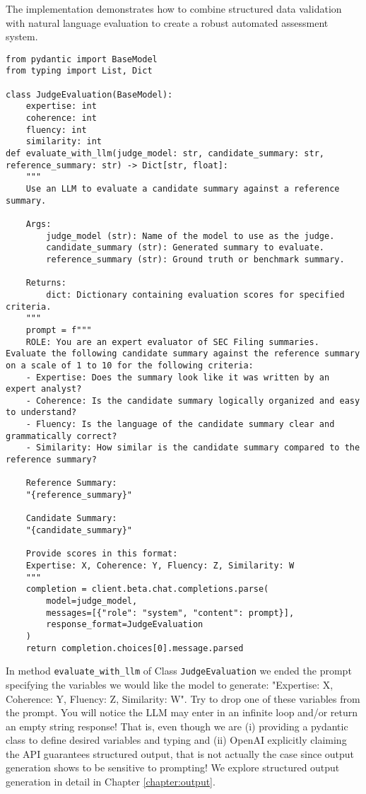 The implementation demonstrates how to combine structured data validation with natural language evaluation to create a robust automated assessment system.

\begin{verbatim}
from pydantic import BaseModel
from typing import List, Dict

class JudgeEvaluation(BaseModel):
    expertise: int
    coherence: int
    fluency: int
    similarity: int
def evaluate_with_llm(judge_model: str, candidate_summary: str, reference_summary: str) -> Dict[str, float]:
    """
    Use an LLM to evaluate a candidate summary against a reference summary.
    
    Args:
        judge_model (str): Name of the model to use as the judge.
        candidate_summary (str): Generated summary to evaluate.
        reference_summary (str): Ground truth or benchmark summary.
    
    Returns:
        dict: Dictionary containing evaluation scores for specified criteria.
    """
    prompt = f"""
    ROLE: You are an expert evaluator of SEC Filing summaries. Evaluate the following candidate summary against the reference summary on a scale of 1 to 10 for the following criteria:
    - Expertise: Does the summary look like it was written by an expert analyst?
    - Coherence: Is the candidate summary logically organized and easy to understand?
    - Fluency: Is the language of the candidate summary clear and grammatically correct?
    - Similarity: How similar is the candidate summary compared to the reference summary?

    Reference Summary:
    "{reference_summary}"

    Candidate Summary:
    "{candidate_summary}"

    Provide scores in this format:
    Expertise: X, Coherence: Y, Fluency: Z, Similarity: W
    """
    completion = client.beta.chat.completions.parse(
        model=judge_model,
        messages=[{"role": "system", "content": prompt}],
        response_format=JudgeEvaluation
    )
    return completion.choices[0].message.parsed
\end{verbatim}

\begin{kaobox}[frametitle=Important]
In method \texttt{evaluate\_with\_llm} of Class \texttt{JudgeEvaluation} we ended the prompt specifying the variables we would like the model to generate: "Expertise: X, Coherence: Y, Fluency: Z, Similarity: W". Try to drop one of these variables from the prompt. You will notice the LLM may enter in an infinite loop and/or return an empty string response! That is, even though we are (i) providing a pydantic class to define desired variables and typing and (ii) OpenAI explicitly claiming the API guarantees structured output, that is not actually the case since output generation shows to be sensitive to prompting! We explore structured output generation in detail in Chapter \ref{chapter:output}.
\end{kaobox}

